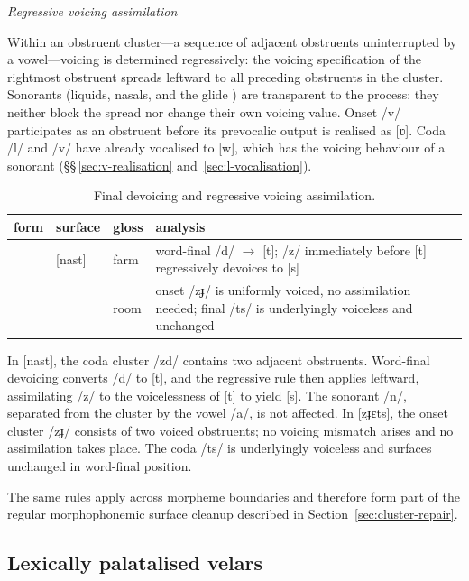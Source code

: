 \noindent\textit{Regressive voicing assimilation}\quad

Within an obstruent cluster---a sequence of adjacent obstruents uninterrupted by a
vowel---voicing is determined regressively: the voicing specification of the
rightmost obstruent spreads leftward to all preceding obstruents in the cluster.
Sonorants (liquids, nasals, and the glide ) are transparent to the process:
they neither block the spread nor change their own voicing value.
Onset /v/ participates as an obstruent before its prevocalic output is
realised as [ʋ]. Coda /l/ and /v/ have already vocalised to [w], which
has the voicing behaviour of a sonorant (§§\,\ref{sec:v-realisation}
and~\ref{sec:l-vocalisation}).

\begin{table}[ht]
	\footnotesize
	\caption{Final devoicing and regressive voicing assimilation.}\label{tab:voicing-assim}
	\begin{tabularx}{\textwidth}{L L L L}
		\toprule
		{\sc form} & {\sc surface} & {\sc gloss} & {\sc analysis} \\
		\midrule
		 & [nast] & farm & word-final /d/ $\rightarrow$ [t]; /z/ immediately before [t] regressively devoices to [s] \\
		 & \ipagloss{[zɟɛts]} & room & onset /zɟ/ is uniformly voiced, no assimilation needed; final /ts/ is underlyingly voiceless and unchanged \\
		\bottomrule
	\end{tabularx}
\end{table}

In  [nast], the coda cluster /zd/ contains two adjacent obstruents.
Word-final devoicing converts /d/ to [t], and the regressive rule then applies
leftward, assimilating /z/ to the voicelessness of [t] to yield [s]. The sonorant
/n/, separated from the cluster by the vowel /a/, is not affected. In 
[zɟɛts], the onset cluster /zɟ/ consists of two voiced obstruents; no voicing
mismatch arises and no assimilation takes place. The coda /ts/ is
underlyingly voiceless and surfaces unchanged in word-final position.

The same rules apply across morpheme boundaries and therefore form part of the
regular morphophonemic surface cleanup described in
Section~\ref{sec:cluster-repair}.

\subsection{Lexically palatalised velars}\label{sec:lexical-palatalised-velars}

